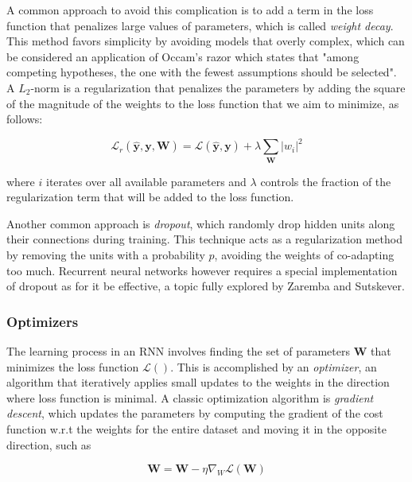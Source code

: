 \documentclass{kththesis}
\begin{document}
A common approach to avoid this complication is to add a term in the loss function that penalizes large values of parameters, which is called \emph{weight decay}. This method favors simplicity by avoiding models that overly complex, which can be considered an application of Occam's razor which states that "among competing hypotheses, the one with the fewest assumptions should be selected". A $L_2$-norm is a regularization that penalizes the parameters by adding the square of the magnitude of the weights to the loss function that we aim to minimize\citep{phaisangittisagul2016analysis}, as follows:

\begin{equation}
\mathcal{L}_r(\hat{\mathbf{y}}, \mathbf{y}, \mathbf{W}) = \mathcal{L}(\hat{\mathbf{y}}, \mathbf{y}) + \lambda \sum_\mathbf{W} |w_i|^2
\end{equation}
 
where $i$ iterates over all available parameters and $\lambda$ controls the fraction of the regularization term that will be added to the loss function.

Another common approach is \emph{dropout}\citep{srivastava2014dropout}, which randomly drop hidden units along their connections during training. This technique acts as a regularization method by removing the units with a probability $p$, avoiding the weights of co-adapting too much. Recurrent neural networks however requires a special implementation of dropout as for it be effective, a topic fully explored by Zaremba and Sutskever\citep{zaremba2014recurrent}.

\subsubsection{Optimizers}

The learning process in an RNN involves finding the set of parameters $\mathbf{W}$ that minimizes the loss function $\mathcal{L}()$. This is accomplished by an \emph{optimizer}, an algorithm that iteratively applies small updates to the weights in the direction where loss function is minimal. A classic optimization algorithm is \emph{gradient descent}, which updates the parameters by computing the gradient of the cost function w.r.t the weights for the entire dataset and moving it in the opposite direction, such as

\begin{equation}
\mathbf{W} = \mathbf{W} - \eta \nabla_W \mathcal{L}(\mathbf{W}) 
\end{equation}
\end{document}

